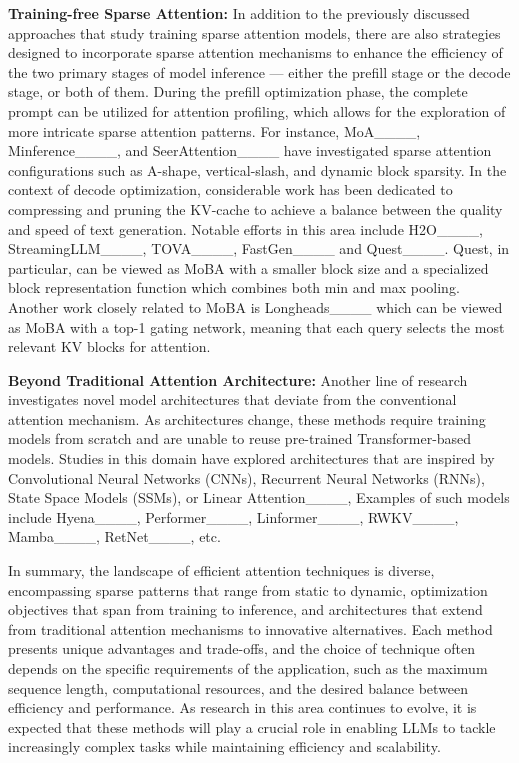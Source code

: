 \textbf{Training-free Sparse Attention:}
In addition to the previously discussed approaches that study training sparse attention models, there are also strategies designed to incorporate sparse attention mechanisms to enhance the efficiency of the two primary stages of model inference --- either the prefill stage or the decode stage, or both of them.
%
During the prefill optimization phase, the complete prompt can be utilized for attention profiling, which allows for the exploration of more intricate sparse attention patterns. For instance, MoA____, Minference____, and SeerAttention____ have investigated sparse attention configurations such as A-shape, vertical-slash, and dynamic block sparsity.
%
In the context of decode optimization, considerable work has been dedicated to compressing and pruning the KV-cache to achieve a balance between the quality and speed of text generation. Notable efforts in this area include H2O____, StreamingLLM____, TOVA____, FastGen____ and  Quest____. Quest, in particular, can be viewed as MoBA with a smaller block size and a specialized block representation function which combines both min and max pooling. Another work closely related to MoBA is Longheads____ which can be viewed as MoBA with a top-1 gating network, meaning that each query selects the most relevant KV blocks for attention.


\textbf{Beyond Traditional Attention Architecture:} Another line of research  investigates novel model architectures that deviate from the conventional attention mechanism. As architectures change, these methods require training models from scratch and are unable to reuse pre-trained Transformer-based models. 
 Studies in this domain have explored architectures that are inspired by  Convolutional Neural Networks (CNNs), Recurrent Neural Networks (RNNs), State Space Models (SSMs), or Linear Attention____, Examples of such models include Hyena____,  Performer____,
Linformer____,
RWKV____, Mamba____, RetNet____, etc.

In summary, the landscape of efficient attention techniques is diverse, encompassing sparse patterns that range from static to dynamic, optimization objectives that span from training to inference, and architectures that extend from traditional attention mechanisms to innovative alternatives.
%
Each method presents unique advantages and trade-offs, and the choice of technique often depends on the specific requirements of the application, such as the maximum sequence length, computational resources, and the desired balance between efficiency and performance. As research in this area continues to evolve, it is expected that these methods will play a crucial role in enabling LLMs to tackle increasingly complex tasks while maintaining efficiency and scalability.